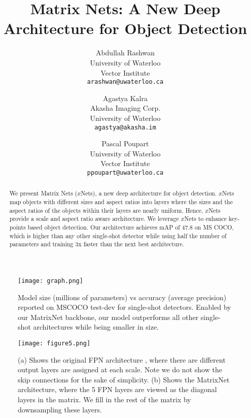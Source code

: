 \documentclass[10pt,twocolumn,letterpaper]{article}
\begin{document}
\title{Matrix Nets: A New Deep Architecture for Object Detection}

\author{Abdullah Rashwan\\
University of Waterloo\\
Vector Institute\\
{\tt\small arashwan@uwaterloo.ca}
\and
Agastya Kalra\\
Akasha Imaging Corp. \\
University of Waterloo\\
{\tt\small agastya@akasha.im} \and
Pascal Poupart\\
University of Waterloo\\
Vector Institute\\
{\tt\small ppoupart@uwaterloo.ca}}




\maketitle
\ificcvfinal\thispagestyle{empty}\fi
 \begin{figure}[t]
\begin{center}
\texttt{[image: graph.png]}
\vspace{-0.5cm}
\end{center}
   \caption{Model size (millions of parameters) vs accuracy (average precision) reported on MSCOCO test-dev for single-shot detectors. Enabled by our MatrixNet backbone, our model outperforms all other single-shot architectures while being smaller in size.}
\label{fig:parameters_map}
\vspace{-0.5cm}
\end{figure}
\begin{abstract}
We present Matrix Nets ($x$Nets), a new deep architecture for object detection. $x$Nets map objects with different sizes and aspect ratios into layers where the sizes and the aspect ratios of the objects within their layers are nearly uniform. Hence, $x$Nets provide a scale and aspect ratio aware architecture. We leverage $x$Nets to enhance key-points based object detection. Our architecture achieves mAP of 47.8 on MS COCO, which is higher than any other single-shot detector while using half the number of parameters and training 3x faster than the next best architecture.
\end{abstract}
\begin{figure}[t]
\begin{center}
\texttt{[image: figure5.png]}
\vspace{-0.5cm}
\end{center}
   \caption{(a) Shows the original FPN architecture \cite{lin2017feature}, where there are different output layers are assigned at each scale. Note we do not show the skip connections for the sake of simplicity. (b) Shows the MatrixNet architecture, where the 5 FPN layers are viewed as the diagonal layers in the matrix. We fill in the rest of the matrix by downsampling these layers.}
\label{fig:xnets}
\vspace{-0.5cm}
\end{figure}
\end{document}
